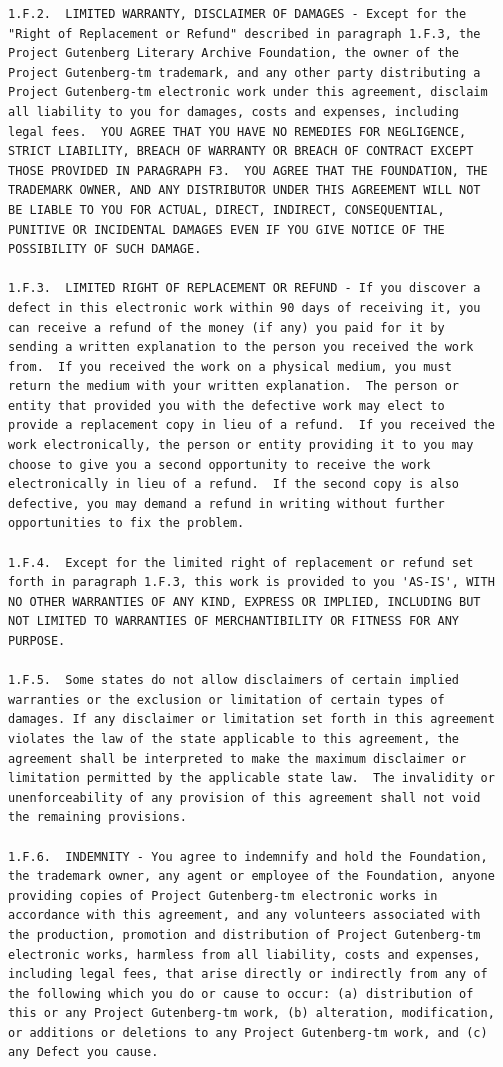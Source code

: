 \documentclass[a4paper,12pt]{book}[2004/02/16]
\theoremstyle{ilemma}
\theoremstyle{itheorem}
\theoremstyle{iother}
\theoremstyle{icorollary}
\theoremstyle{numcorollary}
\theoremstyle{idefinition}
\begin{document}
\begin{verbatim}
1.F.2.  LIMITED WARRANTY, DISCLAIMER OF DAMAGES - Except for the
"Right of Replacement or Refund" described in paragraph 1.F.3, the
Project Gutenberg Literary Archive Foundation, the owner of the
Project Gutenberg-tm trademark, and any other party distributing a
Project Gutenberg-tm electronic work under this agreement, disclaim
all liability to you for damages, costs and expenses, including
legal fees.  YOU AGREE THAT YOU HAVE NO REMEDIES FOR NEGLIGENCE,
STRICT LIABILITY, BREACH OF WARRANTY OR BREACH OF CONTRACT EXCEPT
THOSE PROVIDED IN PARAGRAPH F3.  YOU AGREE THAT THE FOUNDATION, THE
TRADEMARK OWNER, AND ANY DISTRIBUTOR UNDER THIS AGREEMENT WILL NOT
BE LIABLE TO YOU FOR ACTUAL, DIRECT, INDIRECT, CONSEQUENTIAL,
PUNITIVE OR INCIDENTAL DAMAGES EVEN IF YOU GIVE NOTICE OF THE
POSSIBILITY OF SUCH DAMAGE.

1.F.3.  LIMITED RIGHT OF REPLACEMENT OR REFUND - If you discover a
defect in this electronic work within 90 days of receiving it, you
can receive a refund of the money (if any) you paid for it by
sending a written explanation to the person you received the work
from.  If you received the work on a physical medium, you must
return the medium with your written explanation.  The person or
entity that provided you with the defective work may elect to
provide a replacement copy in lieu of a refund.  If you received the
work electronically, the person or entity providing it to you may
choose to give you a second opportunity to receive the work
electronically in lieu of a refund.  If the second copy is also
defective, you may demand a refund in writing without further
opportunities to fix the problem.

1.F.4.  Except for the limited right of replacement or refund set
forth in paragraph 1.F.3, this work is provided to you 'AS-IS', WITH
NO OTHER WARRANTIES OF ANY KIND, EXPRESS OR IMPLIED, INCLUDING BUT
NOT LIMITED TO WARRANTIES OF MERCHANTIBILITY OR FITNESS FOR ANY
PURPOSE.

1.F.5.  Some states do not allow disclaimers of certain implied
warranties or the exclusion or limitation of certain types of
damages. If any disclaimer or limitation set forth in this agreement
violates the law of the state applicable to this agreement, the
agreement shall be interpreted to make the maximum disclaimer or
limitation permitted by the applicable state law.  The invalidity or
unenforceability of any provision of this agreement shall not void
the remaining provisions.

1.F.6.  INDEMNITY - You agree to indemnify and hold the Foundation,
the trademark owner, any agent or employee of the Foundation, anyone
providing copies of Project Gutenberg-tm electronic works in
accordance with this agreement, and any volunteers associated with
the production, promotion and distribution of Project Gutenberg-tm
electronic works, harmless from all liability, costs and expenses,
including legal fees, that arise directly or indirectly from any of
the following which you do or cause to occur: (a) distribution of
this or any Project Gutenberg-tm work, (b) alteration, modification,
or additions or deletions to any Project Gutenberg-tm work, and (c)
any Defect you cause.



\end{verbatim}
\end{document}

